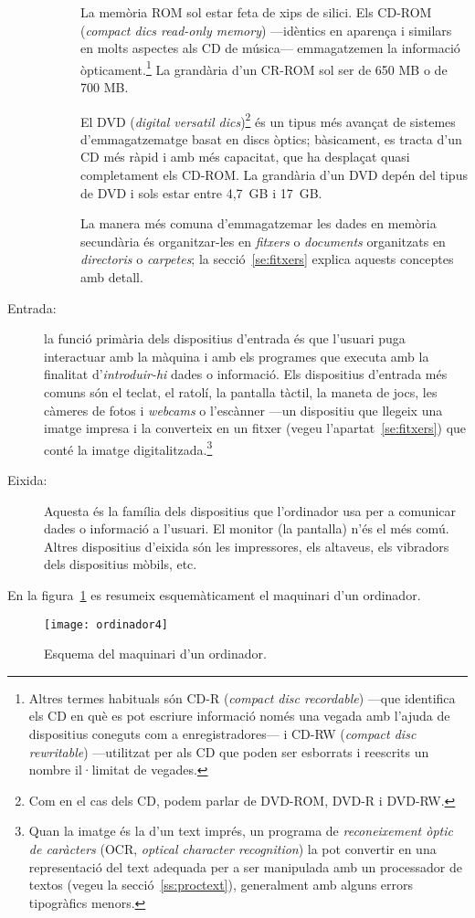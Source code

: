 \begin{description}
\begin{description}
    La memòria ROM sol estar feta de xips de silici. Els CD-ROM
    (\emph{compact dics read-only memory}) ---idèntics en aparença i
    similars en molts aspectes als CD de música--- emmagatzemen la
    informació òpticament.\footnote{Altres termes habituals són CD-R
      (\emph{compact disc recordable}) ---que identifica els CD en què
      es pot escriure informació només una vegada amb l'ajuda de
      dispositius coneguts com a enregistradores--- i CD-RW
      (\emph{compact disc rewritable}) ---utilitzat per als CD que
      poden ser esborrats i reescrits un nombre il·limitat de
      vegades.} La grandària d'un CR-ROM sol ser de 650 MB o de 700
    MB.

    El DVD (\emph{digital versatil dics})\footnote{Com en el cas dels
      CD, podem parlar de DVD-ROM, DVD-R i DVD-RW.} és un tipus més
    avançat de sistemes d'emmagatzematge basat en discs òptics;
    bàsicament, es tracta d'un CD més ràpid i amb més capacitat, que
    ha desplaçat quasi completament els CD-ROM. La grandària d'un DVD
    depén del tipus de DVD i sols estar entre 4,7~GB i 17~GB.
    
    La manera més comuna d'emmagatzemar les dades en memòria
    secundària és organitzar-les en {\em fitxers} o \emph{documents}
    organitzats en \emph{directoris} o \emph{carpetes}; la
    secció~\ref{se:fitxers} explica aquests conceptes amb
    detall.\label{pg:menciofitxer}
  \end{description}

\item[Entrada:] la funció primària dels dispositius d'entrada és que
  l'usuari puga interactuar amb la màquina i amb els programes que
  executa amb la finalitat d'\emph{introduir-hi} dades o
  informació. Els dispositius d'entrada més comuns són el teclat, el
  ratolí, la pantalla tàctil, la maneta de jocs, les càmeres de fotos
  i \emph{webcams} o l'escànner ---un dispositiu que llegeix una
  imatge impresa i la converteix en un fitxer (vegeu
  l'apartat~\ref{se:fitxers}) que conté la imatge
  digitalitzada.\footnote{Quan la imatge és la d'un text imprés, un
    programa de \emph{reconeixement òptic de caràcters} (OCR,
    \emph{optical character recognition}) la pot convertir en una
    representació del text adequada per a ser manipulada amb un
    processador de textos (vegeu la secció~\ref{ss:proctext}),
    generalment amb alguns errors tipogràfics menors.}

\item[Eixida:] Aquesta és la família dels dispositius que l'ordinador
  usa per a comunicar dades o informació a l'usuari.  El monitor (la
  pantalla) n'és el més comú. Altres dispositius d'eixida són les
  impressores, els altaveus, els vibradors dels dispositius mòbils,
  etc.

\end{description}
En la figura~\ref{fg:ordinador} es resumeix esquemàticament el
maquinari d'un ordinador.
\begin{figure}
  \centering
  \texttt{[image: ordinador4]}
  \caption{Esquema del maquinari d'un ordinador.}
  \label{fg:ordinador}
\end{figure}



